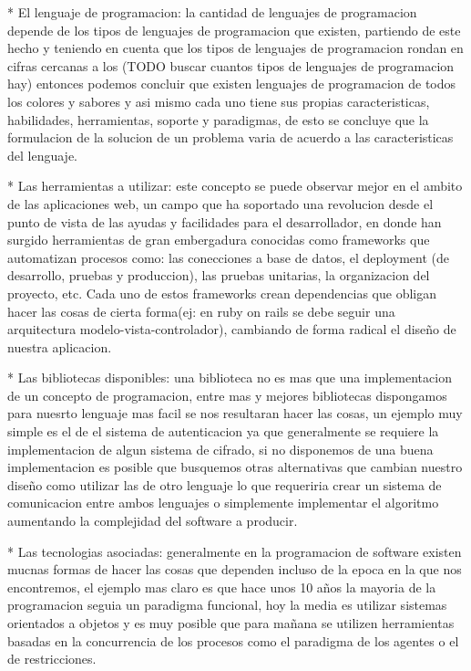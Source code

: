 * El lenguaje de programacion: la cantidad de lenguajes de programacion depende de los tipos de lenguajes de programacion que existen, partiendo de este hecho y teniendo en cuenta que los tipos de lenguajes de programacion rondan en cifras cercanas a los (TODO buscar cuantos tipos de lenguajes de programacion hay) entonces podemos concluir que existen lenguajes de programacion de todos los colores y sabores y asi mismo cada uno tiene sus propias caracteristicas, habilidades, herramientas, soporte y paradigmas, de esto se concluye que la formulacion de la solucion de un problema varia de acuerdo a las caracteristicas del lenguaje.

* Las herramientas a utilizar: este concepto se puede observar mejor en el ambito de las aplicaciones web, un campo que ha soportado una revolucion desde el punto de vista de las ayudas y facilidades para el desarrollador, en donde han surgido herramientas de gran embergadura conocidas como frameworks que automatizan procesos como: las conecciones a base de datos, el deployment (de desarrollo, pruebas y produccion), las pruebas unitarias, la organizacion del proyecto, etc. Cada uno de estos frameworks crean dependencias que obligan hacer las cosas de cierta forma(ej: en ruby on rails se debe seguir una arquitectura modelo-vista-controlador), cambiando de forma radical el diseño de nuestra aplicacion.

* Las bibliotecas disponibles: una biblioteca no es mas que una implementacion de un concepto de programacion, entre mas y mejores bibliotecas dispongamos para nuesrto lenguaje mas facil se nos resultaran hacer las cosas, un ejemplo muy simple es el de el sistema de autenticacion ya que generalmente se requiere la implementacion de algun sistema de cifrado, si no disponemos de una buena implementacion es posible que busquemos otras alternativas que cambian nuestro diseño como utilizar las de otro lenguaje lo que requeriria crear un sistema de comunicacion entre ambos lenguajes o simplemente implementar el algoritmo aumentando la complejidad del software a producir.

* Las tecnologias asociadas: generalmente en la programacion de software existen mucnas formas de hacer las cosas que dependen incluso de la epoca en la que nos encontremos, el ejemplo mas claro es que hace unos 10 años la mayoria de la programacion seguia un paradigma funcional, hoy la media es utilizar sistemas orientados a objetos y es muy posible que para mañana se utilizen herramientas basadas en la concurrencia de los procesos como el paradigma de los agentes o el de restricciones.

